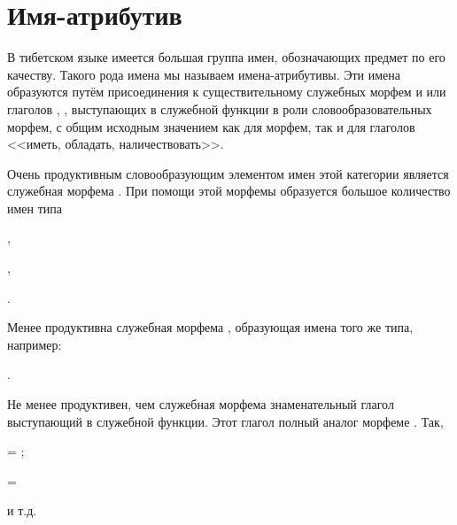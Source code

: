 \section{Имя-атрибутив}

В тибетском языке имеется большая группа имен, обозначающих предмет по его качеству. Такого рода имена мы называем имена-атрибутивы. Эти имена образуются путём присоединения к существительному служебных морфем  и  или глаголов , ,  выступающих в служебной функции в роли словообразовательных морфем, с общим исходным значением как для морфем, так и для глаголов <<иметь, обладать, наличествовать>>.

Очень продуктивным словообразующим элементом имен этой категории является служебная морфема . При помощи этой морфемы образуется большое количество имен типа
\begin{prfsample}
    \item {},
    \item {},
    \item {}.
\end{prfsample}

Менее продуктивна служебная морфема , образующая имена того же типа, например:
\begin{prfsample}
    \item {}.
\end{prfsample}

Не менее продуктивен, чем служебная морфема  знаменательный глагол  выступающий в служебной функции. Этот глагол полный аналог морфеме . Так,
\begin{prfsample}
    \item {} = ;
    \item {} = 
\end{prfsample}
и т.д.

